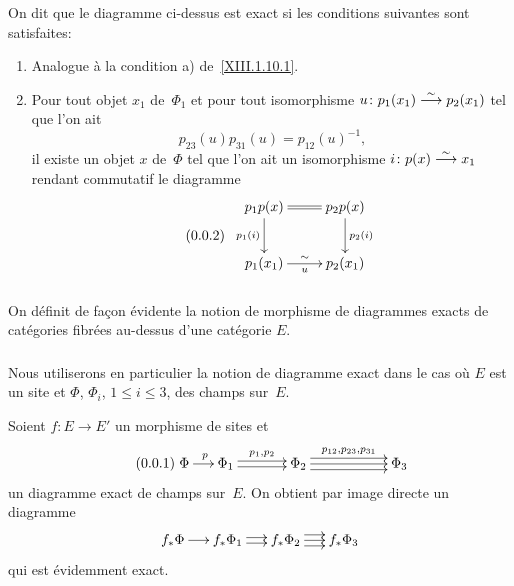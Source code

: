 \begin{definitions}
On dit que le diagramme ci-dessus est exact si les conditions
suivantes sont satisfaites:
\begin{enumerate}
\item[a)] Analogue \`a la condition a) de~\ref{XIII.1.10.1}.
\item[b)] Pour tout objet $x_1$ de~$\Phi_1$ et pour tout isomorphisme
$u \colon p_1(x_1) \overset{\sim}{\longrightarrow} p_2(x_1)$ tel que l'on ait
\begin{equation*}
\label{eq:XIII.1.10.2.1}
\tag{\thesubsubsection.1} { p_{23}(u) p_{31}(u) = p_{12}(u)^{-1}
\text{,} }
\end{equation*}
il existe un objet $x$ de~$\Phi$ tel que l'on ait un isomorphisme $i
\colon p(x) \overset{\sim}{\longrightarrow} x_1$ rendant commutatif le diagramme
\begin{equation*}
\label{eq:XIII.1.10.2.2}
\tag{\thesubsubsection.2}
\begin{array}{c}
{ \xymatrix{{p_1p(x)}\ar@{=}[r]\ar[d]_{p_1(i)}&{p_2p(x)}\ar[d]^{p_2(i)}\\{p_1(x_1)}\ar[r]^{\sim}_u&{p_2(x_1)}} }
\end{array}
\end{equation*}
\end{enumerate}

\subsubsection{}
\label{XIII.1.10.3}
On d\'efinit de fa\c con \'evidente la notion de morphisme de
diagrammes exacts de cat\'egories fibr\'ees au-dessus d'une
cat\'egorie $E$.
\end{definitions}

\subsubsection{}
\label{XIII.1.10.4}
Nous utiliserons
en particulier la notion de diagramme exact dans le
cas o\`u $E$ est un site et $\Phi$, $\Phi_i$, $1 \leqslant i
\leqslant 3$, des champs sur~$E$.

Soient $f \colon E \to E'$ un morphisme de sites et
\begin{equation*}
\label{eq:XIII.1.10.4.1}
\tag{\thesubsubsection.1} { \xymatrix@C=.5cm{{\Phi}\ar[r]^p&{\Phi_1}\ar@<2pt>[rr]^{p_1,p_2}\ar@<-2pt>[rr]&&{\Phi_2}\ar@<4pt>[rrr]^{p_{12},p_{23},p_{31}}\ar[rrr]\ar@<-4pt>[rrr]&&&{\Phi_3}} }
\end{equation*}
un diagramme exact de champs sur~$E$. On obtient par image directe un
diagramme
$$
\xymatrix@C=.5cm{{f_* \Phi}\ar[r]&{f_* \Phi_1}\ar@<2pt>[r]\ar@<-2pt>[r]&{f_* \Phi_2}\ar@<4pt>[r]\ar[r]\ar@<-4pt>[r]&{f_* \Phi_3}}
$$
qui est \'evidemment exact.

